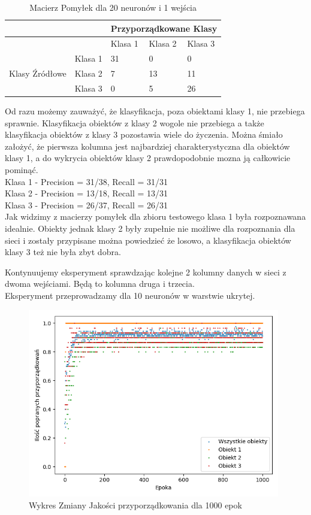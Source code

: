 \documentclass[12pt]{article}
\begin{document}
\begin{table}
\caption{\label{tab:tablica9} Macierz Pomyłek dla 20 neuronów i 1 wejścia }
\begin{tabular}{ |p{3cm}|p{3cm}|p{2cm}|p{2cm}|p{2cm}|  }
 \hline
 & & 
 \multicolumn{3}{|c|}{Przyporządkowane Klasy} \\
 \hline

   & & Klasa 1 & Klasa 2 & Klasa 3\\
 \hline
\multirow{3}{4em}{Klasy Źródłowe}
   & Klasa 1 & 31 & 0 & 0 \\ 
   & Klasa 2 & 7 & 13 & 11 \\
   & Klasa 3 & 0 & 5 & 26 \\

 \hline
\end{tabular}
\end{table}
\newpage
Od razu możemy zauważyć, że klasyfikacja, poza obiektami klasy 1, nie przebiega sprawnie. Klasyfikacja obiektów z klasy 2 wogole nie przebiega a także klasyfikacja obiektów z klasy 3 pozostawia wiele do życzenia. Można śmiało założyć, że pierwsza kolumna jest najbardziej charakterystyczna dla obiektów klasy 1, a do wykrycia obiektów klasy 2 prawdopodobnie mozna ją całkowicie pominąć.
\\Klasa 1 - Precision = 31/38, Recall = 31/31\\
Klasa 2 - Precision = 13/18, Recall = 13/31\\
Klasa 3 - Precision = 26/37, Recall = 26/31\\
Jak widzimy z macierzy pomyłek dla zbioru testowego klasa 1 była rozpoznawana idealnie. Obiekty jednak klasy 2 były zupełnie nie możliwe dla rozpoznania dla sieci i zostały przypisane można powiedzieć że losowo, a klasyfikacja obiektów klasy 3 też nie była zbyt dobra.

\newpage
Kontynuujemy eksperyment sprawdzając kolejne 2 kolumny danych w sieci z dwoma wejściami. Będą to kolumna druga i trzecia.\\Eksperyment przeprowadzamy dla 10 neuronów w warstwie ukrytej.

\begin{figure}[!ht]
 \centering
 \includegraphics[width=11cm]{WykresPrzyporzadkowania10neuron2wejscia1.png}
 \caption{Wykres Zmiany Jakości przyporządkowania dla 1000 epok}
 \vspace{-0.1cm}
 \label{WykresPrzyp11}
\end{figure}
\end{document}
